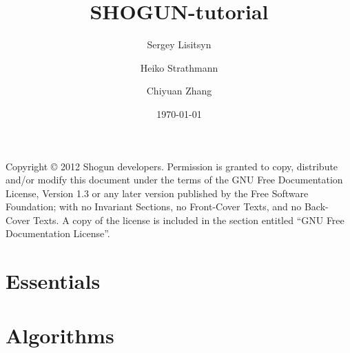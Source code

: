 \documentclass{shogun_tutorial}
\title{SHOGUN-tutorial}
\date{\today}
\author
{
Sergey Lisitsyn \and 
Heiko Strathmann \and 
Chiyuan Zhang \and 
}
\begin{document}
	\maketitle
	Copyright \copyright{}  2012 Shogun developers.
    Permission is granted to copy, distribute and/or modify this document
    under the terms of the GNU Free Documentation License, Version 1.3
    or any later version published by the Free Software Foundation;
    with no Invariant Sections, no Front-Cover Texts, and no Back-Cover Texts.
    A copy of the license is included in the section entitled ``GNU
    Free Documentation License''.
    
    
	\tableofcontents
	\listoftodos
	\part{Essentials}
	
	\part{Algorithms}
	
	
	
	
	
	\begin{appendix}
	
	\end{appendix}
	
	
	 
\end{document}
